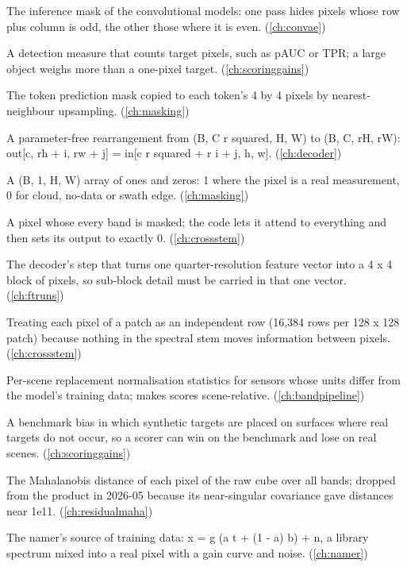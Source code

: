 \begin{description}[style=nextline,leftmargin=1.2em,font=\normalfont\bfseries]
\item[Pixel checkerboard] The inference mask of the convolutional models: one pass hides pixels whose row plus column is odd, the other those where it is even. (\cref{ch:convae})
\item[Pixel measure] A detection measure that counts target pixels, such as pAUC or TPR; a large object weighs more than a one-pixel target. (\cref{ch:scoringgains})
\item[Pixel prediction mask] The token prediction mask copied to each token's 4 by 4 pixels by nearest-neighbour upsampling. (\cref{ch:masking})
\item[Pixel shuffle] A parameter-free rearrangement from (B, C r squared, H, W) to (B, C, rH, rW): out[c, rh + i, rw + j] = in[c r squared + r i + j, h, w]. (\cref{ch:decoder})
\item[Pixel validity mask] A (B, 1, H, W) array of ones and zeros: 1 where the pixel is a real measurement, 0 for cloud, no-data or swath edge. (\cref{ch:masking})
\item[Pixel with no valid band] A pixel whose every band is masked; the code lets it attend to everything and then sets its output to exactly 0. (\cref{ch:crossstem})
\item[Pixel-shuffle bottleneck] The decoder's step that turns one quarter-resolution feature vector into a 4 x 4 block of pixels, so sub-block detail must be carried in that one vector. (\cref{ch:ftruns})
\item[Pixels as a batch] Treating each pixel of a patch as an independent row (16,384 rows per 128 x 128 patch) because nothing in the spectral stem moves information between pixels. (\cref{ch:crossstem})
\item[PixelStatsOverride] Per-scene replacement normalisation statistics for sensors whose units differ from the model's training data; makes scores scene-relative. (\cref{ch:bandpipeline})
\item[Placement bias] A benchmark bias in which synthetic targets are placed on surfaces where real targets do not occur, so a scorer can win on the benchmark and lose on real scenes. (\cref{ch:scoringgains})
\item[Plain RX] The Mahalanobis distance of each pixel of the raw cube over all bands; dropped from the product in 2026-05 because its near-singular covariance gave distances near 1e11. (\cref{ch:residualmaha})
\item[Planted-sample generator] The namer's source of training data: x = g (a t + (1 - a) b) + n, a library spectrum mixed into a real pixel with a gain curve and noise. (\cref{ch:namer})

\end{description}
